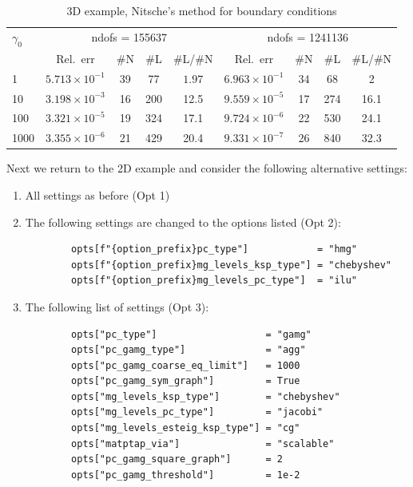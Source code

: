 \documentclass[12pt]{article}
\begin{document}
\begin{table}
\begin{tabular}{lcccccccc}\toprule
   $\gamma_0$ & \multicolumn{4}{c}{ndofs = 155637} & \multicolumn{4}{c}{ndofs = 1241136}
    \\\cmidrule(lr){2-5}\cmidrule(lr){6-9}
               & Rel.~err &\#N& \#L & \#L/\#N& Rel.~err &\#N& \#L & \#L/\#N\\\midrule
1 &$ 5.713 \times 10^{-1}$& 39 & 77 & $1.97$ &$6.963\times 10^{-1}$ & 34 & 68& 2\\
10 & $3.198 \times 10^{-3}$ & 16 & 200 & 12.5 &$9.559\times 10^{-5}$ & 17 & 274 & 16.1\\
100  &  $3.321\times 10^{-5}$ & 19 & 324 & 17.1&  $9.724\times 10^{-6}$ & 22 & 530 & 24.1\\
1000 & $3.355\times 10^{-6}$ & 21 & 429 & 20.4 & $9.331 \times 10^{-7}$ & 26 & 840 & 32.3 \\
    \bottomrule
    \end{tabular}
    \caption{3D example, Nitsche's method for boundary conditions}
\end{table}
\FloatBarrier
Next we return to the 2D example and consider the following alternative settings:
\begin{enumerate}
    \item All settings as before (Opt 1)
    \item The following settings are changed to the options listed (Opt 2):
    \begin{verbatim}
        opts[f"{option_prefix}pc_type"]            = "hmg"
        opts[f"{option_prefix}mg_levels_ksp_type"] = "chebyshev"
        opts[f"{option_prefix}mg_levels_pc_type"]  = "ilu"
    \end{verbatim}
    \item The following list of settings (Opt 3):
    \begin{verbatim}
        opts["pc_type"]                   = "gamg"
        opts["pc_gamg_type"]              = "agg"
        opts["pc_gamg_coarse_eq_limit"]   = 1000
        opts["pc_gamg_sym_graph"]         = True
        opts["mg_levels_ksp_type"]        = "chebyshev"
        opts["mg_levels_pc_type"]         = "jacobi"
        opts["mg_levels_esteig_ksp_type"] = "cg"
        opts["matptap_via"]               = "scalable"
        opts["pc_gamg_square_graph"]      = 2
        opts["pc_gamg_threshold"]         = 1e-2 
        \end{verbatim}
\end{enumerate}
\end{document}

